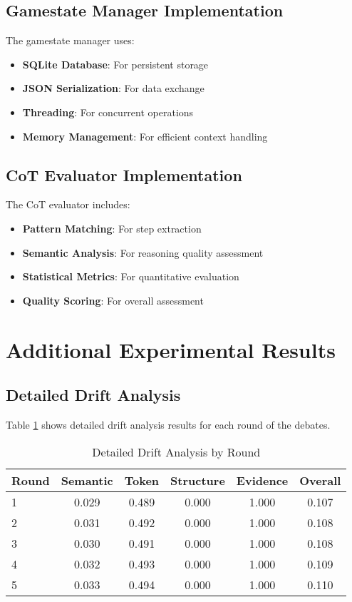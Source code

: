 \documentclass[11pt]{article}
\begin{document}
\subsection{Gamestate Manager Implementation}

The gamestate manager uses:

\begin{itemize}
    \item \textbf{SQLite Database}: For persistent storage
    \item \textbf{JSON Serialization}: For data exchange
    \item \textbf{Threading}: For concurrent operations
    \item \textbf{Memory Management}: For efficient context handling
\end{itemize}

\subsection{CoT Evaluator Implementation}

The CoT evaluator includes:

\begin{itemize}
    \item \textbf{Pattern Matching}: For step extraction
    \item \textbf{Semantic Analysis}: For reasoning quality assessment
    \item \textbf{Statistical Metrics}: For quantitative evaluation
    \item \textbf{Quality Scoring}: For overall assessment
\end{itemize}

\section{Additional Experimental Results}

\subsection{Detailed Drift Analysis}

Table \ref{tab:detailed_drift} shows detailed drift analysis results for each round of the debates.

\begin{table}[h]
\centering
\caption{Detailed Drift Analysis by Round}
\label{tab:detailed_drift}
\begin{tabular}{lccccc}
\toprule
Round & Semantic & Token & Structure & Evidence & Overall \\
\midrule
1 & 0.029 & 0.489 & 0.000 & 1.000 & 0.107 \\
2 & 0.031 & 0.492 & 0.000 & 1.000 & 0.108 \\
3 & 0.030 & 0.491 & 0.000 & 1.000 & 0.108 \\
4 & 0.032 & 0.493 & 0.000 & 1.000 & 0.109 \\
5 & 0.033 & 0.494 & 0.000 & 1.000 & 0.110 \\
\bottomrule
\end{tabular}
\end{table}
\end{document}
